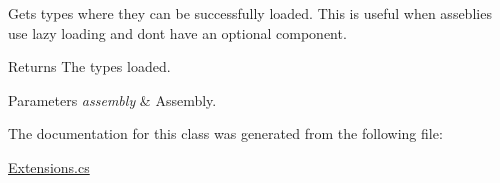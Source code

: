 Gets types where they can be successfully loaded. This is useful when asseblies use lazy loading and don\textquotesingle{}t have an optional component. 

\begin{DoxyReturn}{Returns}
The types loaded.
\end{DoxyReturn}

\begin{DoxyParams}{Parameters}
{\em assembly} & Assembly.\\
\hline
\end{DoxyParams}


The documentation for this class was generated from the following file\+:\begin{DoxyCompactItemize}
\item 
\hyperlink{Extensions_8cs}{Extensions.\+cs}\end{DoxyCompactItemize}
